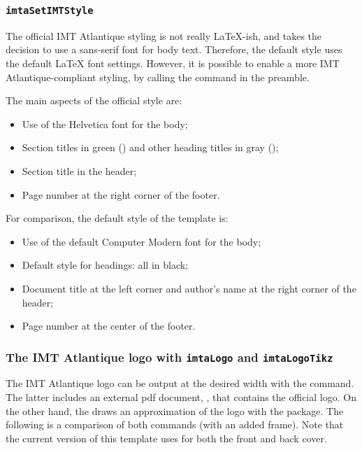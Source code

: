 \documentclass{report}
\begin{document}
\subsubsection{\texttt{imtaSetIMTStyle}}
The official IMT Atlantique styling is not really \LaTeX-ish, and takes the decision to use a sans-serif font for body text.
Therefore, the default style uses the default \LaTeX{} font settings.
However, it is possible to enable a more IMT Atlantique-compliant styling, by calling the  command in the preamble.

\vspace{1em}
The main aspects of the official style are:

\begin{itemize}
    \item Use of the Helvetica font for the body;
    \item Section titles in green () and other heading titles in gray ();
    \item Section title in the header;
    \item Page number at the right corner of the footer.
\end{itemize}

\vspace{1em}
For comparison, the default style of the template is:

\begin{itemize}
    \item Use of the default Computer Modern font for the body;
    \item Default style for headings: all in black;
    \item Document title at the left corner and author's name at the right corner of the header;
    \item Page number at the center of the footer.
\end{itemize}


\subsubsection{The IMT Atlantique logo with \texttt{imtaLogo} and \texttt{imtaLogoTikz}}
The IMT Atlantique logo can be output at the desired width with the  command.
The latter includes an external pdf document, , that contains the official logo.
On the other hand, the  draws an approximation of the logo with the  package.
The following is a comparison of both commands (with an added frame). Note that the current version of this template uses  for both the front and back cover.
\end{document}
